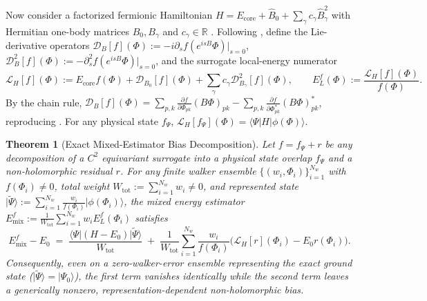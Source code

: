 \documentclass[11pt,a4paper]{article}
\newtheorem{theorem}{Theorem}[section]
\theoremstyle{definition}
\newcommand{\R}{\mathbb{R}}
\newcommand{\ket}[1]{\lvert #1 \rangle}
\newcommand{\bra}[1]{\langle #1 \rvert}
\begin{document}
Now consider a factorized fermionic Hamiltonian $H = E_{\mathrm{core}} + \hat{B}_0 + \sum_\gamma c_\gamma \hat{B}_\gamma^2$ with Hermitian one-body matrices $B_0, B_\gamma$ and $c_\gamma \in \R$ \cite[Eq.~(S2.9)]{jiang2026machine}. Following \cite[Eq.~(S2.21)]{jiang2026machine}, define the Lie-derivative operators $\mathcal{D}_B[f](\Phi) := -i \partial_s f(e^{isB}\Phi)|_{s=0}$, $\mathcal{D}_B^2[f](\Phi) := -\partial_s^2 f(e^{isB}\Phi)|_{s=0}$, and the surrogate local-energy numerator
\[
  \mathcal{L}_H[f](\Phi) := E_{\mathrm{core}} f(\Phi) + \mathcal{D}_{B_0}[f](\Phi) + \sum_\gamma c_\gamma \mathcal{D}_{B_\gamma}^2[f](\Phi), \qquad E_L^f(\Phi) := \frac{\mathcal{L}_H[f](\Phi)}{f(\Phi)}.
\]
By the chain rule, $\mathcal{D}_B[f](\Phi) = \sum_{p,k}\frac{\partial f}{\partial \Phi_{pk}}(B\Phi)_{pk} - \sum_{p,k}\frac{\partial f}{\partial \Phi^*_{pk}}(B\Phi)^*_{pk}$, reproducing \cite[Eq.~(S2.22)]{jiang2026machine}. For any physical state $f_\Psi$, $\mathcal{L}_H[f_\Psi](\Phi) = \bra{\Psi} H \ket{\phi(\Phi)}$.

\begin{theorem}[Exact Mixed-Estimator Bias Decomposition]\label{thm:bias}
Let $f = f_\Psi + r$ be any decomposition of a $C^2$ equivariant surrogate into a physical state overlap $f_\Psi$ and a non-holomorphic residual $r$. For any finite walker ensemble $\{(w_i, \Phi_i)\}_{i=1}^{N_w}$ with $f(\Phi_i) \neq 0$, total weight $W_{\mathrm{tot}} := \sum_{i=1}^{N_w} w_i \neq 0$, and represented state $\ket{\widetilde{\Psi}} := \sum_{i=1}^{N_w} \frac{w_i}{f(\Phi_i)} \ket{\phi(\Phi_i)}$, the mixed energy estimator $E_{\mathrm{mix}}^f := \frac{1}{W_{\mathrm{tot}}} \sum_{i=1}^{N_w} w_i E_L^f(\Phi_i)$ satisfies
\begin{equation}\label{eq:bias_decomp}
  E_{\mathrm{mix}}^f - E_0 \;=\; \frac{\bra{\Psi}(H - E_0)\ket{\widetilde{\Psi}}}{W_{\mathrm{tot}}} \;+\; \frac{1}{W_{\mathrm{tot}}} \sum_{i=1}^{N_w} \frac{w_i}{f(\Phi_i)} \big(\mathcal{L}_H[r](\Phi_i) - E_0 r(\Phi_i)\big).
\end{equation}
Consequently, even on a \emph{zero-walker-error} ensemble representing the exact ground state ($\ket{\widetilde{\Psi}} = \ket{\Psi_0}$), the first term vanishes identically while the second term leaves a generically nonzero, representation-dependent non-holomorphic bias.
\end{theorem}
\end{document}
